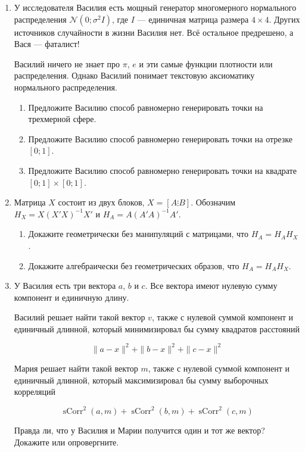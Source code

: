 \documentclass[12pt]{article} %
\theoremstyle{definition} %
\DeclareMathOperator{\sCorr}{sCorr}
\def \cN{\mathcal{N}}
\begin{document}
\begin{enumerate}
\item У исследователя Василия есть мощный генератор многомерного нормального распределения
$\cN(0;\sigma^2 I)$, где $I$ — единичная матрица размера $4\times 4$. 
Других источников случайности в жизни Василия нет. Всё остальное предрешено, а Вася — фаталист!

Василий ничего не знает про $\pi$, $e$ и эти самые функции плотности или распределения.
Однако Василий понимает текстовую аксиоматику нормального распределения. 

\begin{enumerate}
\item Предложите Василию способ равномерно генерировать точки на трехмерной сфере.
\item Предложите Василию способ равномерно генерировать точки на отрезке $[0;1]$.
\item Предложите Василию способ равномерно генерировать точки на квадрате $[0;1]\times [0;1]$.
\end{enumerate}


\item Матрица $X$ состоит из двух блоков, $X = [A \vdots B]$. Обозначим
$H_X = X(X'X)^{-1}X'$ и $H_A = A(A'A)^{-1}A'$. 

\begin{enumerate}
    \item Докажите геометрически без манипуляций с матрицами, что $H_A = H_A H_X$.
    \item Докажите алгебраически без геометрических образов, что $H_A = H_A H_X$.
\end{enumerate}


\item У Василия есть три вектора $a$, $b$ и $c$. 
Все вектора имеют нулевую сумму компонент и единичную длину. 

Василий решает найти такой вектор $v$, также с нулевой суммой компонент и единичный длинной, 
который минимизировал бы сумму квадратов расстояний 

\[
    \|a - x\|^2 + \|b - x\|^2 + \|c - x\|^2
\]

Мария решает найти такой вектор $m$, также с нулевой суммой компонент и единичный длинной,
который максимизировал бы сумму выборочных корреляций

\[
\sCorr^2(a, m) +   \sCorr^2(b, m) +\sCorr^2(c, m) 
\]


Правда ли, что у Василия и Марии получится один и тот же вектор? 
Докажите или опровергните.



\end{enumerate}
\end{document}

